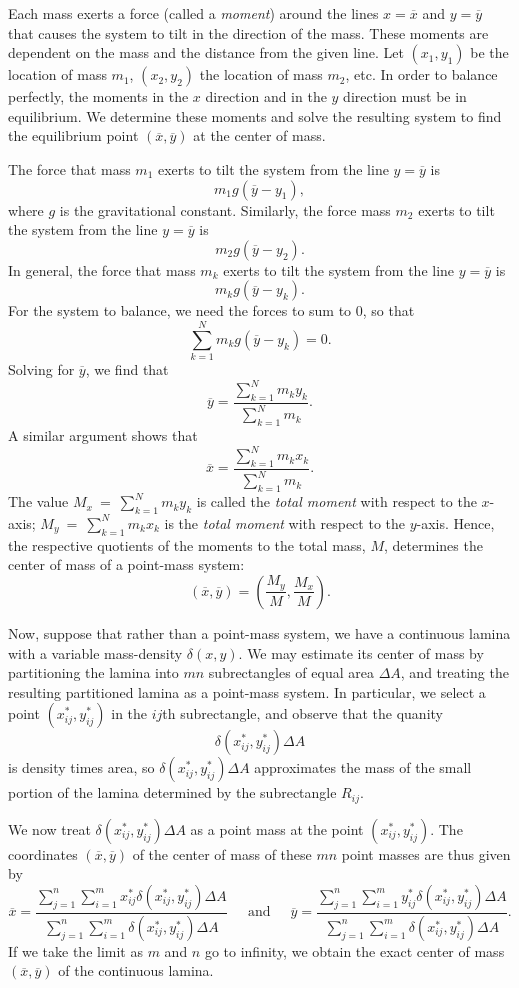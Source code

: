 Each mass exerts a force (called a \emph{moment}) around the lines $x=\overline{x}$ and $y=\overline{y}$ that causes the system to tilt in the direction of the mass. These moments are dependent on the mass and the distance from the given line. Let $(x_1,y_1)$ be the location of mass $m_1$, $(x_2,y_2)$ the location of mass $m_2$, etc. In order to balance perfectly, the moments in the $x$ direction and in the $y$ direction must be in equilibrium. We determine these moments and solve the resulting system to find the equilibrium point $(\overline{x}, \overline{y})$ at the center of mass.

The force that mass $m_1$ exerts to tilt the system from the line $y=\overline{y}$ is
\[m_1g(\overline{y} - y_1),\]
where $g$ is the gravitational constant. Similarly, the force mass $m_2$ exerts to tilt the system from the line $y= \overline{y}$ is
\[m_2g(\overline{y}-y_2).\]
In general, the force that mass $m_k$ exerts to tilt the system from the line $y= \overline{y}$ is
\[m_kg(\overline{y}-y_k).\]
For the system to balance, we need the forces to sum to 0, so that
\[\sum_{k=1}^N m_kg(\overline{y}-y_k) = 0.\]
Solving for $\overline{y}$, we find that
\[\overline{y} = \frac{\sum_{k=1}^N m_ky_k}{\sum_{k=1}^N m_k}.\]
A similar argument shows that
\[\overline{x} = \frac{\sum_{k=1}^N m_kx_k}{\sum_{k=1}^N m_k}.\]
The value $M_x~=~\sum_{k=1}^N m_ky_k$ is called the \emph{total moment} with respect to the $x$-axis; $M_y~=~\sum_{k=1}^N m_kx_k$ is the \emph{total moment} with respect to the $y$-axis.  Hence, the respective quotients of the moments to the total mass, $M$,  determines the center of mass of a point-mass system: $$(\overline{x}, \overline{y}) = \left(\frac{M_y}{M}, \frac{M_x}{M}\right).$$

Now, suppose that rather than a point-mass system, we have a continuous lamina with a variable mass-density $\delta(x, y)$. We may estimate its center of mass by partitioning the lamina into $mn$ subrectangles of equal area $\Delta A$, and treating the resulting partitioned lamina as a point-mass system.  In particular, we select a point $(x_{ij}^*,y_{ij}^*)$ in the $ij$th subrectangle, and observe that the quanity
\[\delta(x_{ij}^*,y_{ij}^*) \Delta A\]
is density times area, so $\delta(x_{ij}^*,y_{ij}^*) \Delta A$ approximates the mass of the small portion of the lamina determined by the subrectangle $R_{ij}$. 

We now treat $\delta(x_{ij}^*,y_{ij}^*) \Delta A$ as a point mass at the point $(x_{ij}^*,y_{ij}^*)$. The coordinates $(\overline{x}, \overline{y})$ of the center of mass of these $mn$ point masses are thus given by
\[\overline{x} = \frac{\sum_{j=1}^n \sum_{i=1}^m x_{ij}^*\delta(x_{ij}^*,y_{ij}^*) \Delta A}{\sum_{j=1}^n\sum_{i=1}^m \delta(x_{ij}^*,y_{ij}^*) \Delta A} \ \ \ \ \ \text{ and } \ \ \ \ \ \overline{y} = \frac{\sum_{j=1}^n \sum_{i=1}^m y_{ij}^*\delta(x_{ij}^*,y_{ij}^*) \Delta A}{\sum_{j=1}^n\sum_{i=1}^m \delta(x_{ij}^*,y_{ij}^*) \Delta A}.\]
If we take the limit as $m$ and $n$ go to infinity, we obtain the exact center of mass $(\overline{x}, \overline{y})$ of the continuous lamina.

